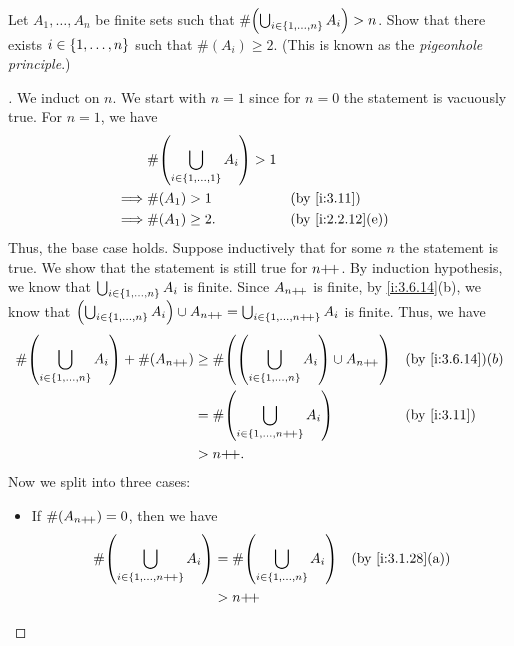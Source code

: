\begin{ex}\label{i:ex:3.6.10}
  Let \(A_1, \dots, A_n\) be finite sets such that \(\#\pa{\bigcup_{i \in \set{1, \dots, n}} A_i} > n\).
  Show that there exists \(i \in \left\lbrace1, \dots, n\right\rbrace\) such that \(\#(A_i) \geq 2\).
  (This is known as the \emph{pigeonhole principle}.)
\end{ex}

\begin{proof}[]
  We induct on \(n\).
  We start with \(n = 1\) since for \(n = 0\) the statement is vacuously true.
  For \(n = 1\), we have
  \begin{align*}
             & \#\pa{\bigcup_{i \in \set{1, \dots, 1}} A_i} > 1                       \\
    \implies & \#(A_1) > 1                                      &  & \by{i:3.11}      \\
    \implies & \#(A_1) \geq 2.                                  &  & \by{i:2.2.12}[e]
  \end{align*}
  Thus, the base case holds.
  Suppose inductively that for some \(n\) the statement is true.
  We show that the statement is still true for \(n{+}\!{+}\).
  By induction hypothesis, we know that \(\bigcup_{i \in \left\lbrace1, \dots, n\right\rbrace} A_i\) is finite.
  Since \(A_{n{+}\!{+}}\) is finite, by \cref{i:3.6.14}(b), we know that \(\left\lparen\bigcup_{i \in \left\lbrace1, \dots, n\right\rbrace} A_i\right\rparen \cup A_{n{+}\!{+}} = \bigcup_{i \in \left\lbrace1, \dots, n{+}\!{+}\right\rbrace} A_i\) is finite.
  Thus, we have
  \begin{align*}
    \#\pa{\bigcup_{i \in \set{1, \dots, n}} A_i} + \#(A_{n\pp}) & \geq \#\pa{\pa{\bigcup_{i \in \set{1, \dots, n}} A_i} \cup A_{n\pp}} &  & \by{i:3.6.14}(b) \\
                                                                & = \#\pa{\bigcup_{i \in \set{1, \dots, n\pp}} A_i}                    &  & \by{i:3.11}      \\
                                                                & > n\pp.
  \end{align*}
  Now we split into three cases:
  \begin{itemize}
    \item If \(\#(A_{n{+}\!{+}}) = 0\), then we have
          \begin{align*}
            \#\pa{\bigcup_{i \in \set{1, \dots, n\pp}} A_i} & = \#\pa{\bigcup_{i \in \set{1, \dots, n}} A_i} &  & \by{i:3.1.28}[a] \\
                                                            & > n\pp                                                               \\

\end{align*}
\end{itemize}
\end{proof}

